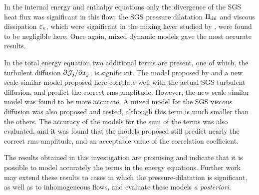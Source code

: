 \documentclass[tcfd]{svjour}
\begin{document}
In the internal energy and enthalpy equations only the divergence of
the SGS heat f\/lux was signif\/icant in this f\/low; the SGS pressure
dilatation $\Pi_{\rm dil}$ and viscous dissipation $\varepsilon_{\rm v}$,
which were signif\/icant in the mixing layer studied by \citet{vre95b},
were found to be negligible here. Once again, mixed dynamic models
gave the most accurate results.

In the total energy equation two additional terms are present, one of
which, the turbulent diffusion $\partial{\cal J}_j/\partial x_j$, is
signif\/icant. The model proposed by \citet{kni98} and a new
scale-similar model proposed here correlate well with the actual SGS
turbulent diffusion, and predict the correct {\rm rms} amplitude.
However, the new scale-similar model was found to be more accurate. A
mixed model for the SGS viscous diffusion was also proposed and
tested, although this term is much smaller than the others. The
accuracy of the models for the sum of the terms was also evaluated,
and it was found that the models proposed still predict nearly the
correct {\rm rms} amplitude, and an acceptable value of the
correlation coeff\/icient.

The results obtained in this investigation are promising and indicate
that it is possible to model accurately the terms in the energy
equations. Further work may extend these results to cases in which the
pressure-dilatation is signif\/icant, as well as to inhomogeneous
f\/lows, and evaluate these models {\it a posteriori}.

\end{document}
